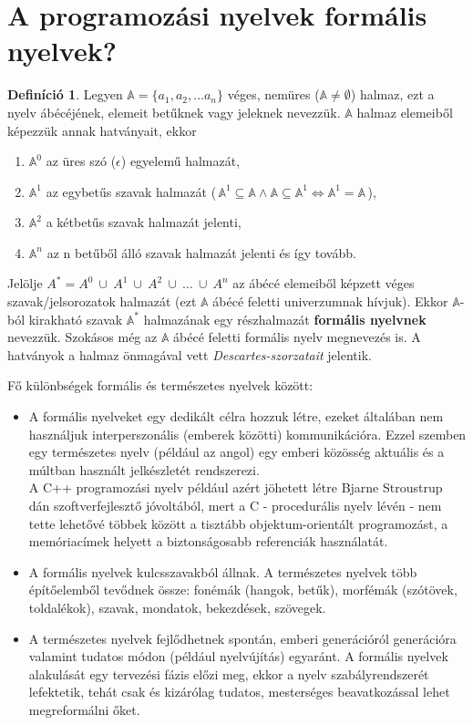 \documentclass[tocnopagenum]{thesis-ekf}
\theoremstyle{definition}
\newtheorem{definicio}[tetel]{Definíció}
\theoremstyle{remark}
\begin{document}
	\section{A programozási nyelvek formális nyelvek?}
	\begin{definicio}
		Legyen $\mathbb{A} = \{a_1, a_2, ... a_n\}$ véges, nemüres ($ \mathbb{A} \neq \emptyset$) halmaz, ezt a nyelv ábécéjének, elemeit betűknek vagy jeleknek nevezzük. $\mathbb{A}$ halmaz elemeiből képezzük annak hatványait, ekkor 
		\begin{enumerate}
			\item $\mathbb{A} ^ {0}$ az üres szó ($\epsilon$) egyelemű halmazát, 
			\item $\mathbb{A} ^ {1} $ az egybetűs szavak halmazát (\,$\mathbb{A}^{1}\subseteq\mathbb{A}\wedge\mathbb{A}\subseteq\mathbb{A}^{1} \iff \mathbb{A}^{1}=\mathbb{A}$\,), 
			\item $\mathbb{A}^{2}$ a kétbetűs szavak halmazát jelenti, 
			\item $\mathbb{A}^{n}$ az n betűből álló szavak halmazát jelenti és így tovább.
		\end{enumerate}
	Jelölje $A^{*}=A^{0}\ \cup\ A^{1}\ \cup\ A^{2}\ \cup\ \dots\ \cup\  A^{n}$ az ábécé elemeiből képzett véges szavak/jelsorozatok halmazát (ezt $\mathbb{A}$ ábécé feletti univerzumnak hívjuk). Ekkor  $\mathbb{A}$-ból kirakható szavak $\mathbb{A}^{*}$ halmazának egy részhalmazát \textbf{formális nyelvnek} nevezzük. Szokásos még az $\mathbb{A}$ ábécé feletti formális nyelv megnevezés is. A hatványok a halmaz önmagával vett \emph{Descartes-szorzatait} jelentik.
	\cite{formnyelvek}
	\end{definicio}
	
	Fő különbségek formális és természetes nyelvek között:
	\begin{itemize}
		\item A formális nyelveket egy dedikált célra hozzuk létre, ezeket általában nem használjuk interperszonális (emberek közötti) kommunikációra. Ezzel szemben egy természetes nyelv (például az angol) egy emberi közösség aktuális és a múltban használt jelkészletét rendszerezi.\\
		A C++ programozási nyelv például azért jöhetett létre Bjarne Stroustrup dán szoftverfejlesztő jóvoltából, mert a C - procedurális nyelv lévén - nem tette lehetővé többek között a tisztább objektum-orientált programozást, a memóriacímek helyett a biztonságosabb referenciák használatát. \cite{cpplang1}
		\item A formális nyelvek kulcsszavakból állnak. A természetes nyelvek több építőelemből tevődnek össze: fonémák (hangok, betűk), morfémák (szótövek, toldalékok), szavak, mondatok, bekezdések, szövegek.
		\item A természetes nyelvek fejlődhetnek spontán, emberi generációról generációra valamint tudatos módon (például nyelvújítás) egyaránt. A formális nyelvek alakulását egy tervezési fázis előzi meg, ekkor a nyelv szabályrendszerét lefektetik, tehát csak és kizárólag tudatos, mesterséges beavatkozással lehet megreformálni őket.
	\end{itemize} \cite{langvid1} \cite{langvid2}
\end{document}
